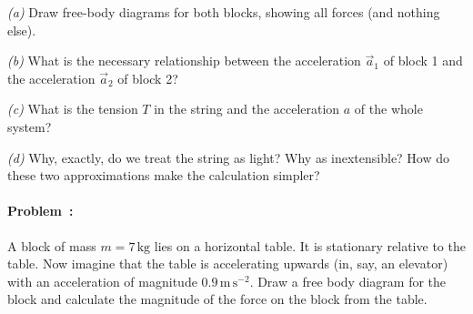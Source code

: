 \documentclass[12pt]{article}
\newcommand{\kg}{\mathrm{kg}}
\newcommand{\m}{\mathrm{m}}
\newcommand{\s}{\mathrm{s}}
\begin{document}
\textsl{(a)} Draw free-body diagrams for both blocks, showing all
forces (and nothing else).

\textsl{(b)} What is the necessary relationship between the
acceleration $\vec{a}_1$ of block 1 and the acceleration $\vec{a}_2$
of block 2?

\textsl{(c)} What is the tension $T$ in the string and the
acceleration $a$ of the whole system?

\textsl{(d)} Why, exactly, do we treat the string as light?  Why as
inextensible?  How do these two approximations make the calculation
simpler?

\paragraph{Problem~\theproblem:}%
A block of mass $m=7\,\kg$ lies on a horizontal table.  It is
stationary relative to the table.  Now imagine that the table is
accelerating upwards (in, say, an elevator) with an acceleration of magnitude
$0.9\,\m\,\s^{-2}$.  Draw a free body diagram for the block and
calculate the magnitude of the force on the block from the table.
\end{document}
